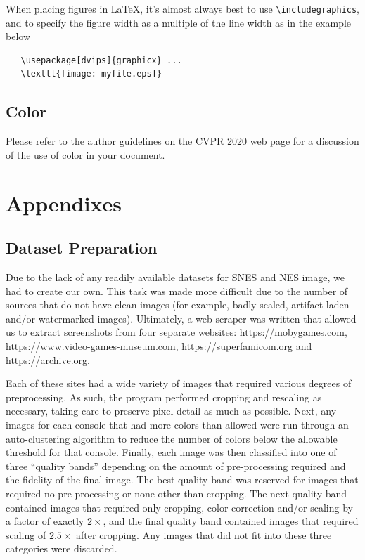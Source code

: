 \documentclass[10pt,twocolumn,letterpaper]{article}
\begin{document}
When placing figures in \LaTeX, it's almost always best to use
\verb+\includegraphics+, and to specify the  figure width as a multiple of
the line width as in the example below
   {\small\begin{verbatim}
   \usepackage[dvips]{graphicx} ...
   \texttt{[image: myfile.eps]}
\end{verbatim}
   }


\subsection{Color}

Please refer to the author guidelines on the CVPR 2020 web page for a discussion
of the use of color in your document.

\section{Appendixes}
\subsection{Dataset Preparation}
Due to the lack of any readily available datasets for SNES and NES image, we had to create our own.
This task was made more difficult due to the number of sources that do not have clean images (for example, badly scaled, artifact-laden and/or watermarked images).
Ultimately, a web scraper was written that allowed us to extract screenshots from four separate websites: \url{https://mobygames.com}, \url{https://www.video-games-museum.com}, \url{https://superfamicom.org} and \url{https://archive.org}.

Each of these sites had a wide variety of images that required various degrees of preprocessing. As such, the program performed cropping and rescaling as necessary, taking care to preserve pixel detail as much as possible. 
Next, any images for each console that had more colors than allowed were run through an auto-clustering algorithm to reduce the number of colors below the allowable threshold for that console.
Finally, each image was then classified into one of three ``quality bands'' depending on the amount of pre-processing required and the fidelity of the final image. The best quality band was reserved for images that required no pre-processing or none other than cropping. The next quality band contained images that  required only cropping, color-correction and/or scaling by a factor of exactly $2\times$, and the final quality band contained images that required scaling of $2.5\times$ after cropping. Any images that did not fit into these three categories were discarded. 
\end{document}

